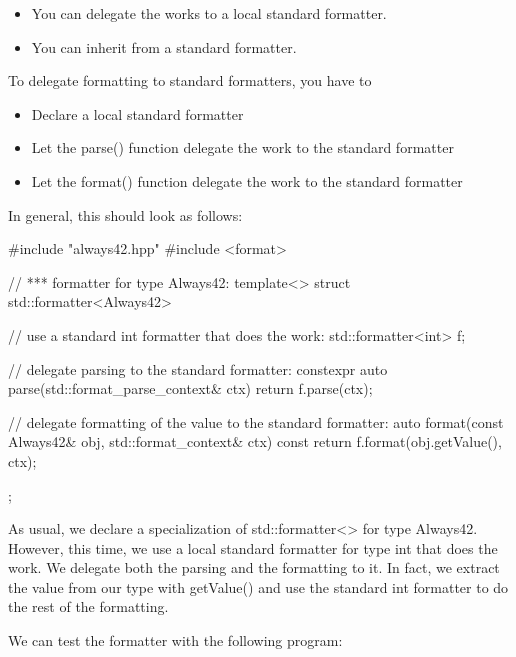\begin{itemize}
\item
You can delegate the works to a local standard formatter.

\item
You can inherit from a standard formatter.
\end{itemize}


To delegate formatting to standard formatters, you have to

\begin{itemize}
\item
Declare a local standard formatter

\item
Let the parse() function delegate the work to the standard formatter

\item
Let the format() function delegate the work to the standard formatter
\end{itemize}

In general, this should look as follows:


\begin{cpp}
#include "always42.hpp"
#include <format>

// *** formatter for type Always42:
template<>
struct std::formatter<Always42>
{
	// use a standard int formatter that does the work:
	std::formatter<int> f;
	
	// delegate parsing to the standard formatter:
	constexpr auto parse(std::format_parse_context& ctx) {
		return f.parse(ctx);
	}
	
	// delegate formatting of the value to the standard formatter:
	auto format(const Always42& obj, std::format_context& ctx) const {
		return f.format(obj.getValue(), ctx);
	}
};
\end{cpp}

As usual, we declare a specialization of std::formatter<> for type Always42. However, this time, we use a local standard formatter for type int that does the work. We delegate both the parsing and the formatting to it. In fact, we extract the value from our type with getValue() and use the standard int formatter to do the rest of the formatting.

We can test the formatter with the following program:


